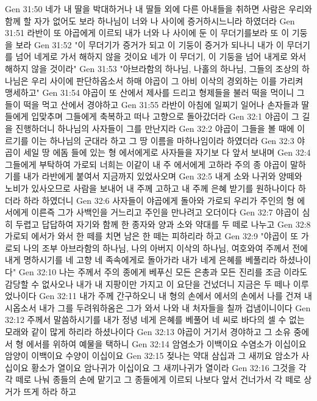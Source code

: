 Gen 31:50  네가 내 딸을 박대하거나 내 딸들 외에 다른 아내들을 취하면 사람은 우리와 함께 할 자가 없어도 보라 하나님이 너와 나 사이에 증거하시느니라 하였더라
Gen 31:51  라반이 또 야곱에게 이르되 내가 너와 나 사이에 둔 이 무더기를보라 또 이 기둥을 보라
Gen 31:52  "이 무더기가 증거가 되고 이 기둥이 증거가 되나니 내가 이 무더기를 넘어 네게로 가서 해하지 않을 것이요 네가 이 무더기, 이 기둥을 넘어 내게로 와서 해하지 않을 것이라"
Gen 31:53  "아브라함의 하나님, 나홀의 하나님, 그들의 조상의 하나님은 우리 사이에 판단하옵소서 하매 야곱이 그 아비 이삭의 경외하는 이를 가리켜 맹세하고"
Gen 31:54  야곱이 또 산에서 제사를 드리고 형제들을 불러 떡을 먹이니 그 들이 떡을 먹고 산에서 경야하고
Gen 31:55  라반이 아침에 일찌기 일어나 손자들과 딸들에게 입맞추며 그들에게 축복하고 떠나 고향으로 돌아갔더라
Gen 32:1  야곱이 그 길을 진행하더니 하나님의 사자들이 그를 만난지라
Gen 32:2  야곱이 그들을 볼 때에 이르기를 이는 하나님의 군대라 하고 그 땅 이름을 마하나임이라 하였더라
Gen 32:3  야곱이 세일 땅 에돔 들에 있는 형 에서에게로 사자들을 자기보 다 앞서 보내며
Gen 32:4  그들에게 부탁하여 가로되 너희는 이같이 내 주 에서에게 고하라 주의 종 야곱이 말하기를 내가 라반에게 붙여서 지금까지 있었사오며
Gen 32:5  내게 소와 나귀와 양떼와 노비가 있사오므로 사람을 보내어 내 주께 고하고 내 주께 은혜 받기를 원하나이다 하더라 하라 하였더니
Gen 32:6  사자들이 야곱에게 돌아와 가로되 우리가 주인의 형 에서에게 이른즉 그가 사백인을 거느리고 주인을 만나려고 오더이다
Gen 32:7  야곱이 심히 두렵고 답답하여 자기와 함께 한 종자와 양과 소와 약대를 두 떼로 나누고
Gen 32:8  가로되 에서가 와서 한 떼를 치면 남은 한 떼는 피하리라 하고
Gen 32:9  "야곱이 또 가로되 나의 조부 아브라함의 하나님, 나의 아버지 이삭의 하나님, 여호와여 주께서 전에 내게 명하시기를 네 고향 네 족속에게로 돌아가라 내가 네게 은혜를 베풀리라 하셨나이다"
Gen 32:10  나는 주께서 주의 종에게 베푸신 모든 은총과 모든 진리를 조금 이라도 감당할 수 없사오나 내가 내 지팡이만 가지고 이 요단을 건넜더니 지금은 두 떼나 이루었나이다
Gen 32:11  내가 주께 간구하오니 내 형의 손에서 에서의 손에서 나를 건져 내시옵소서 내가 그를 두려워하옴은 그가 와서 나와 내 처자들을 칠까 겁냄이니이다
Gen 32:12  주께서 말씀하시기를 내가 정녕 네게 은혜를 베풀어 네 씨로 바다의 셀 수 없는 모래와 같이 많게 하리라 하셨나이다
Gen 32:13  야곱이 거기서 경야하고 그 소유 중에서 형 에서를 위하여 예물을 택하니
Gen 32:14  암염소가 이백이요 수염소가 이십이요 암양이 이백이요 수양이 이십이요
Gen 32:15  젖나는 약대 삼십과 그 새끼요 암소가 사십이요 황소가 열이요 암나귀가 이십이요 그 새끼나귀가 열이라
Gen 32:16  그것을 각각 떼로 나눠 종들의 손에 맡기고 그 종들에게 이르되 나보다 앞서 건너가서 각 떼로 상거가 뜨게 하라 하고
